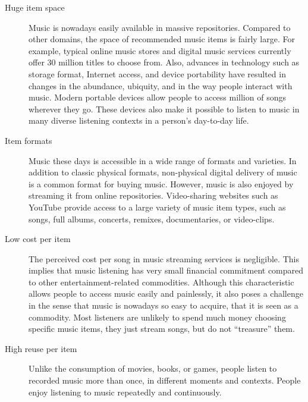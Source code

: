\begin{description}

	\item [Huge item space] Music is nowadays easily available in massive repositories. Compared to other domains, the space of recommended music items is fairly large. For example, typical online music stores and digital music services currently offer 30 million titles to choose from. 
	Also, advances in technology such as storage format, Internet access, and device portability have resulted in changes in the abundance, ubiquity, and in the way people interact with music. Modern portable devices allow people to access million of songs wherever they go. These devices also make it possible to listen to music in many diverse listening contexts in a person's day-to-day life.

	\item [Item formats] Music these days is accessible in a wide range of formats and varieties. In addition to classic physical formats, non-physical digital delivery of music is a common format for buying music. However, music is also enjoyed by streaming it from online repositories. Video-sharing websites such as YouTube provide access to a large variety of music item types, such as songs, full albums, concerts, remixes, documentaries, or video-clips. 

	\item [Low cost per item] The perceived cost per song in music streaming services is negligible. This implies that music listening has very small financial commitment compared to other entertainment-related commodities. Although this characteristic allows people to access music easily and painlessly, it also poses a challenge in the sense that music is nowadays so easy to acquire, that it is seen as a commodity. Most listeners are unlikely to spend much money choosing specific music items, they just stream songs, but do not ``treasure'' them. 
	
	\item [High reuse per item] Unlike the consumption of movies, books, or games, people listen to recorded music more than once, in different moments and contexts. People enjoy listening to music repeatedly and continuously.


\end{description}
